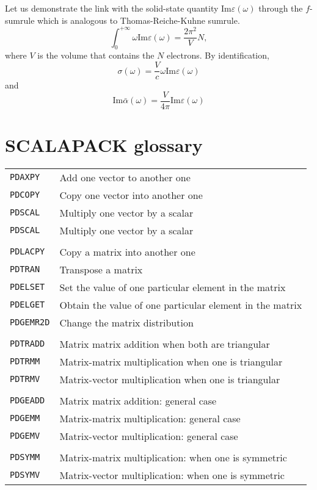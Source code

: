 \documentclass[aps,prb,reprint,showpacs]{revtex4-1}
\begin{document}
Let us demonstrate the link with the solid-state quantity $\mathrm{Im} \varepsilon(\omega)$
through the $f$-sumrule which is analogous to Thomas-Reiche-Kuhne sumrule.
\begin{equation}
 \int_0^{+\infty} \omega \mathrm{Im}\varepsilon(\omega) = \frac{2\pi^2}{V} N ,
\end{equation}
where $V$ is the volume that contains the $N$ electrons.
By identification, 
\begin{equation}
 \sigma(\omega) = \frac{V}{c} \omega \mathrm{Im}\varepsilon(\omega)
\end{equation}
and
\begin{equation}
 \mathrm{Im} \bar\alpha(\omega) = \frac{V}{4\pi} \mathrm{Im}\varepsilon(\omega)
\end{equation}



\newpage

\section{SCALAPACK glossary}


\begin{table*}[h!]
\begin{tabular}{ll}
\texttt{PDAXPY}  &   Add one vector to another one \\
\texttt{PDCOPY}  &   Copy one vector into another one \\
\texttt{PDSCAL}  &   Multiply one vector by a scalar \\
\texttt{PDSCAL}  &   Multiply one vector by a scalar \\
\\
\texttt{PDLACPY} &   Copy a matrix into another one \\
\texttt{PDTRAN}  &   Transpose a matrix \\
\texttt{PDELSET} &   Set the value of one particular element in the matrix \\
\texttt{PDELGET} &   Obtain the value of one particular element in the matrix \\
\texttt{PDGEMR2D}&   Change the matrix distribution \\
\\
\texttt{PDTRADD} &   Matrix matrix addition when both are triangular \\
\texttt{PDTRMM}  &   Matrix-matrix multiplication when one is triangular \\
\texttt{PDTRMV}  &   Matrix-vector multiplication when one is triangular \\
\\
\texttt{PDGEADD} &   Matrix matrix addition: general case \\
\texttt{PDGEMM}  &   Matrix-matrix multiplication: general case \\
\texttt{PDGEMV}  &   Matrix-vector multiplication: general case \\
\\
\texttt{PDSYMM}  &   Matrix-matrix multiplication: when one is symmetric \\
\texttt{PDSYMV}  &   Matrix-vector multiplication: when one is symmetric \\
\end{tabular}
\end{table*}
\end{document}
